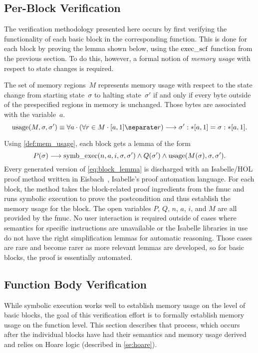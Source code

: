 \subsection{Per-Block Verification}\label{sse:per-block}
The verification methodology presented here occurs
by first verifying the functionality of each basic block in the corresponding function.
This is done for each block by proving the lemma shown below,
using the $\operatorname{exec\_scf}$ function from the previous section.
To do this, however, a formal notion of \emph{memory usage}
with respect to state changes is required.
\begin{definition}\label{def:mem_usage}
  The set of memory regions~$M$ represents memory usage with respect to
  the state change from starting state~$\sigma$ to halting state~$\sigma'$
  if and only if every byte outside of the prespecified regions in memory is unchanged.
  Those bytes are associated with the variable~$a$.
  \begin{equation}
    \usage(M,\sigma,\sigma')\equiv\forall a\cdot(\forall r\in M\cdot\region{a}1\separate r)
    \longrightarrow\readmemS{\sigma'}a{1}=\readmemS{\sigma}a{1}.
  \end{equation}
\end{definition}
Using \cref{def:mem_usage}, each block gets a lemma of the form
\begin{equation}
  P(\sigma)\longrightarrow\operatorname{symb\_exec}(n,a,i,\sigma,\sigma')\wedge
  Q(\sigma')\wedge\operatorname{usage}(M(\sigma),\sigma,\sigma').\label{eq:block_lemma}
\end{equation}
Every generated version of \cref{eq:block_lemma} is discharged
with an Isabelle/HOL proof method written in Eisbach~\citep{matichuk2016eisbach},
Isabelle's proof automation language.
For each block, the method takes the block-related proof ingredients
from the \ac{fmuc} and runs symbolic execution
to prove the postcondition and thus establish the memory usage for the block.
The open variables $P$, $Q$, $n$, $a$, $i$, and $M$ are all provided by the \ac{fmuc}.
No user interaction is required outside of cases where semantics
for specific instructions are unavailable or the Isabelle libraries in use
do not have the right simplification lemmas for automatic reasoning.
Those cases are rare and become rarer as more relevant lemmas are developed,
so for basic blocks, the proof is essentially automated.

\subsection{Function Body Verification}
While symbolic execution works well to establish memory usage on the level of basic blocks,
the goal of this verification effort is to formally establish memory usage
on the function level. This section describes that process,
which occurs after the individual blocks have had their semantics and memory usage derived
and relies on Hoare logic (described in \cref{se:hoare}).

